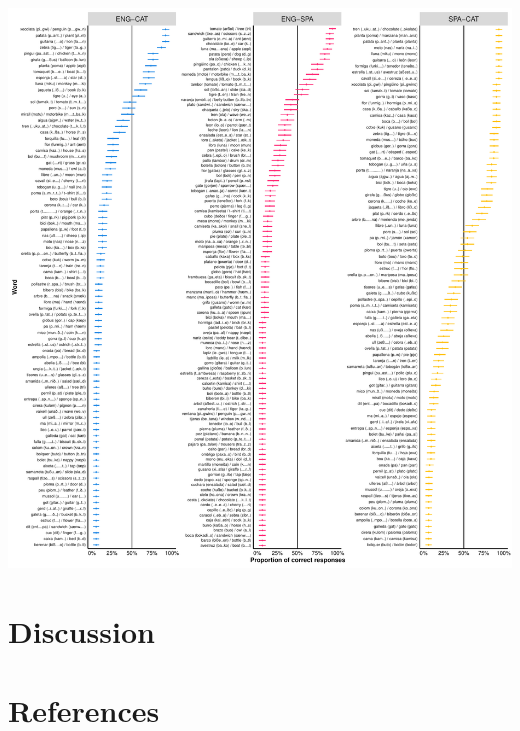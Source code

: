 \documentclass[
  man]{apa6}
\begin{document}
\includegraphics{manuscript_files/figure-latex/accuracy-1.pdf}

\hypertarget{discussion}{%
\section{Discussion}\label{discussion}}

\newpage

\hypertarget{references}{%
\section{References}\label{references}}

\begingroup
\setlength{\parindent}{-0.5in}
\setlength{\leftskip}{0.5in}
\end{document}
